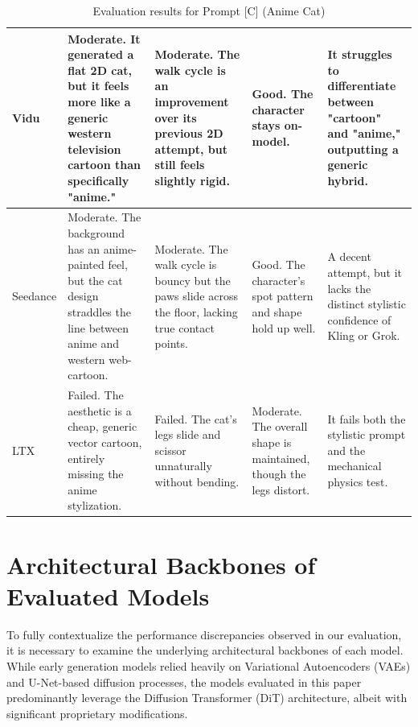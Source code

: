 \documentclass[sigconf]{acmart}
\begin{document}
\begin{table}[t]
\begin{tabularx}{\textwidth}{| l | >{\raggedright\arraybackslash}X | >{\raggedright\arraybackslash}X | >{\raggedright\arraybackslash}X | >{\raggedright\arraybackslash}X |}
        Vidu           & Moderate. It generated a flat 2D cat, but it feels more like a generic western television cartoon than specifically "anime."                                                               & Moderate. The walk cycle is an improvement over its previous 2D attempt, but still feels slightly rigid.   & Good. The character stays on-model.                                 & It struggles to differentiate between "cartoon" and "anime," outputting a generic hybrid.                                                                             \\ \hline
        Seedance       & Moderate. The background has an anime-painted feel, but the cat design straddles the line between anime and western web-cartoon.                                                           & Moderate. The walk cycle is bouncy but the paws slide across the floor, lacking true contact points.       & Good. The character's spot pattern and shape hold up well.          & A decent attempt, but it lacks the distinct stylistic confidence of Kling or Grok.                                                                                    \\ \hline
        LTX            & Failed. The aesthetic is a cheap, generic vector cartoon, entirely missing the anime stylization.                                                                                          & Failed. The cat's legs slide and scissor unnaturally without bending.                                      & Moderate. The overall shape is maintained, though the legs distort. & It fails both the stylistic prompt and the mechanical physics test.                                                                                                   \\ \hline
    \end{tabularx}
    \caption{Evaluation results for Prompt [C] (Anime Cat)}
    \label{tab:eval_prompt_7}
\end{table}

\section{Architectural Backbones of Evaluated Models}
\label{sec:architectures}

To fully contextualize the performance discrepancies observed in our evaluation, it is necessary to examine the underlying architectural backbones of each model. While early generation models relied heavily on Variational Autoencoders (VAEs) and U-Net-based diffusion processes, the models evaluated in this paper predominantly leverage the Diffusion Transformer (DiT) architecture, albeit with significant proprietary modifications.
\end{document}
